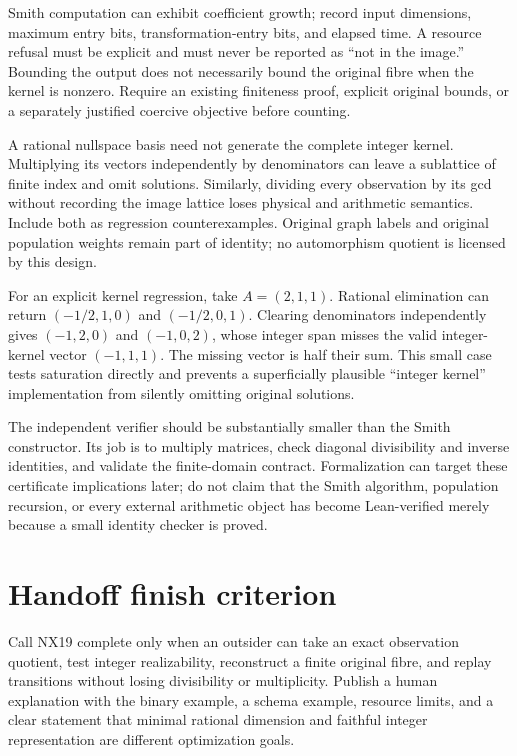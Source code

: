 \documentclass[
  11pt,
  a4paper,
]{report}
\begin{document}
Smith computation can exhibit coefficient growth; record input
dimensions, maximum entry bits, transformation-entry bits, and elapsed
time. A resource refusal must be explicit and must never be reported as
``not in the image.'' Bounding the output does not necessarily bound the
original fibre when the kernel is nonzero. Require an existing
finiteness proof, explicit original bounds, or a separately justified
coercive objective before counting.

A rational nullspace basis need not generate the complete integer
kernel. Multiplying its vectors independently by denominators can leave
a sublattice of finite index and omit solutions. Similarly, dividing
every observation by its gcd without recording the image lattice loses
physical and arithmetic semantics. Include both as regression
counterexamples. Original graph labels and original population weights
remain part of identity; no automorphism quotient is licensed by this
design.

For an explicit kernel regression, take \(A=(2,1,1)\). Rational
elimination can return \((-1/2,1,0)\) and \((-1/2,0,1)\). Clearing
denominators independently gives \((-1,2,0)\) and \((-1,0,2)\), whose
integer span misses the valid integer-kernel vector \((-1,1,1)\). The
missing vector is half their sum. This small case tests saturation
directly and prevents a superficially plausible ``integer kernel''
implementation from silently omitting original solutions.

The independent verifier should be substantially smaller than the Smith
constructor. Its job is to multiply matrices, check diagonal
divisibility and inverse identities, and validate the finite-domain
contract. Formalization can target these certificate implications later;
do not claim that the Smith algorithm, population recursion, or every
external arithmetic object has become Lean-verified merely because a
small identity checker is proved.

\hypertarget{handoff-finish-criterion}{%
\section{Handoff finish criterion}\label{handoff-finish-criterion}}

Call NX19 complete only when an outsider can take an exact observation
quotient, test integer realizability, reconstruct a finite original
fibre, and replay transitions without losing divisibility or
multiplicity. Publish a human explanation with the binary example, a
schema example, resource limits, and a clear statement that minimal
rational dimension and faithful integer representation are different
optimization goals.
\end{document}
